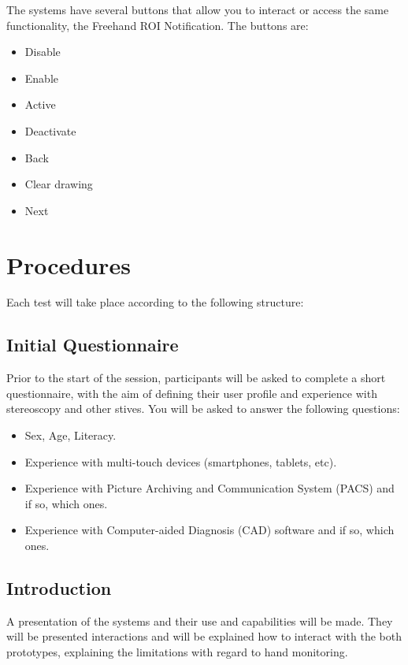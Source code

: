 \documentclass{article}
\begin{document}
The systems have several buttons that allow you to interact or access the same functionality, the Freehand ROI Notification. The buttons are:

\begin{itemize}
  \item Disable
  \item Enable
  \item Active
  \item Deactivate
  \item Back
  \item Clear drawing
  \item Next
\end{itemize}

\section{Procedures}

Each test will take place according to the following structure:

\subsection{Initial Questionnaire}

Prior to the start of the session, participants will be asked to complete a short questionnaire, with the aim of defining their user profile and experience with stereoscopy and other stives. You will be asked to answer the following questions:

\begin{itemize}
  \item Sex, Age, Literacy.
  \item Experience with multi-touch devices (smartphones, tablets, etc).
  \item Experience with Picture Archiving and Communication System (PACS) and if so, which ones.
  \item Experience with Computer-aided Diagnosis (CAD) software and if so, which ones.
\end{itemize}

\clearpage

\subsection{Introduction}

A presentation of the systems and their use and capabilities will be made. They will be presented interactions and will be explained how to interact with the both prototypes, explaining the limitations with regard to hand monitoring.
\end{document}
